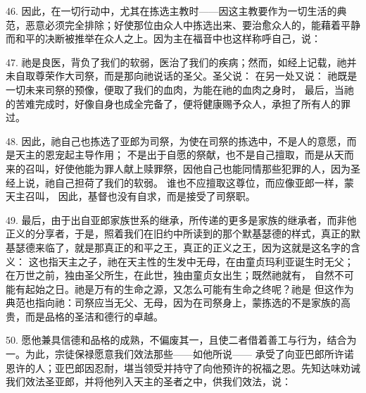 46. 因此，在一切行动中，尤其在拣选主教时——因这主教要作为一切生活的典范，恶意必须完全排除；好使那位由众人中拣选出来、要治愈众人的，能藉着平静而和平的决断被推举在众人之上。因为主在福音中也这样称呼自己，说：\par

47. 祂是良医，背负了我们的软弱，医治了我们的疾病；然而，如经上记载，祂并未自取尊荣作大司祭，而是那向祂说话的圣父。圣父说：  在另一处又说： 祂既是一切未来司祭的预像，便取了我们的血肉，为能在祂的血肉之身时， 最后，当祂的苦难完成时，好像自身也成全完备了，便将健康赐予众人，承担了所有人的罪过。\par

48. 因此，祂自己也拣选了亚郎为司祭，为使在司祭的拣选中，不是人的意愿，而是天主的恩宠起主导作用； 不是出于自愿的祭献，也不是自己擅取，而是从天而来的召叫，好使他能为罪人献上赎罪祭，因他自己也能同情那些犯罪的人，因为圣经上说，祂自己担荷了我们的软弱。 谁也不应擅取这尊位，而应像亚郎一样，蒙天主召叫， 因此，基督也没有自求，而是接受了司祭职。\par

49. 最后，由于出自亚郎家族世系的继承，所传递的更多是家族的继承者，而非他正义的分享者，于是，照着我们在旧约中所读到的那个默基瑟德的样式，真正的默基瑟德来临了，就是那真正的和平之王，真正的正义之王，因为这就是这名字的含义：  这也指天主之子，祂在天主性的生发中无母，在由童贞玛利亚诞生时无父；在万世之前，独由圣父所生，在此世，独由童贞女出生；既然祂就有， 自然不可能有起始之日。祂是万有的生命之源，又怎么可能有生命之终呢？祂是  但这作为典范也指向祂：司祭应当无父、无母，因为在司祭身上，蒙拣选的不是家族的高贵，而是品格的圣洁和德行的卓越。\par

50. 愿他兼具信德和品格的成熟，不偏废其一，且使二者借着善工与行为，结合为一。为此，宗徒保禄愿意我们效法那些——如他所说——  承受了向亚巴郎所许诺恩许的人；亚巴郎因忍耐，堪当领受并持守了向他预许的祝福之恩。先知达味劝诫我们效法圣亚郎，并将他列入天主的圣者之中，供我们效法，说：\par

